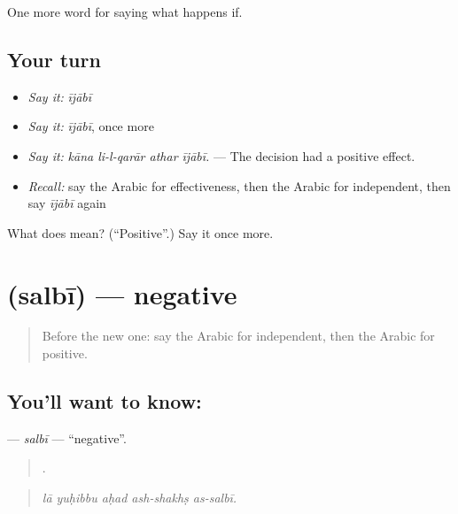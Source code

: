 \begin{grammarlens}[title={What you've built}]
One more word for saying what happens if.
\end{grammarlens}

\subsection*{Your turn}
\begin{itemize}
\raggedright
  \item \emph{Say it:} \emph{ījābī}
  \item \emph{Say it:} \emph{ījābī}, once more
  \item \emph{Say it:} \emph{kāna li-l-qarār athar ījābī.} — The decision had a positive effect.
  \item \emph{Recall:} say the Arabic for effectiveness, then the Arabic for independent, then say \emph{ījābī} again
\end{itemize}

\begin{tcolorbox}[breakable,colback=teal!4,colframe=teal!35!black,title={Before you move on}]
What does  mean? (\textquotedblleft{}Positive\textquotedblright{}.) Say it once more.
\end{tcolorbox}
\section[\texorpdfstring{\ar{سلبي} (salbī)}{سلبي (salbī)}]{ (salbī) — negative}

\label{lesson:AR-C419-salbi}



\begin{quote}
Before the new one: say the Arabic for independent, then the Arabic for positive.
\end{quote}

\subsection*{You'll want to know: }
\textbf{} — \emph{salbī} — \textquotedblleft{}negative\textquotedblright{}.

\begin{quote}
    .
\end{quote}

\begin{quote}
\emph{lā yuḥibbu aḥad ash-shakhṣ as-salbī.}
\end{quote}

